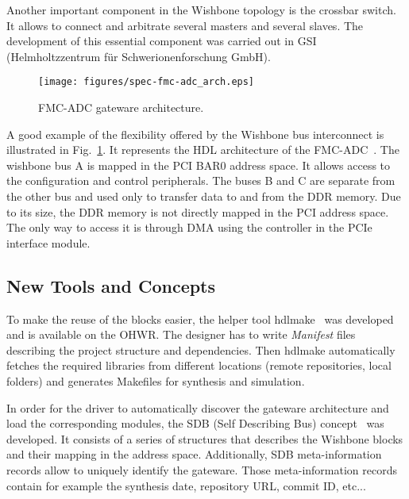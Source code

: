 \documentclass{JAC2003}
\begin{document}
Another important component in the Wishbone topology is the crossbar switch.
It allows to connect and arbitrate several masters and several slaves.
The development of this essential component was carried out in GSI (Helmholtzzentrum f\"ur Schwerionenforschung GmbH).

\begin{figure}[htb]
   \centering
   \texttt{[image: figures/spec-fmc-adc\_arch.eps]}
   \caption{FMC-ADC gateware architecture.}
   \label{spec-fmc-adc_arch}
\end{figure}

A good example of the flexibility offered by the Wishbone bus interconnect is illustrated in Fig.~\ref{spec-fmc-adc_arch}.
It represents the HDL architecture of the FMC-ADC~\cite{fmc-adc}.
The wishbone bus A is mapped in the PCI BAR0 address space.
It allows access to the configuration and control peripherals.
The buses B and C are separate from the other bus and used only to transfer data to and from the DDR memory.
Due to its size, the DDR memory is not directly mapped in the PCI address space.
The only way to access it is through DMA using the controller in the PCIe interface module.

\subsection{New Tools and Concepts}

To make the reuse of the blocks easier, the helper tool hdlmake~\cite{hdlmake} was developed and is available on the OHWR.
The designer has to write \textit{Manifest} files describing the project structure and dependencies.
Then hdlmake automatically fetches the required libraries from different locations (remote repositories, local folders) and generates Makefiles for synthesis and simulation.

In order for the driver to automatically discover the gateware architecture and load the corresponding modules, the SDB (Self Describing Bus) concept~\cite{sdb} was developed.
It consists of a series of structures that describes the Wishbone blocks and their mapping in the address space.
Additionally, SDB meta-information records allow to uniquely identify the gateware.
Those meta-information records contain for example the synthesis date, repository URL, commit ID, etc...
\end{document}
